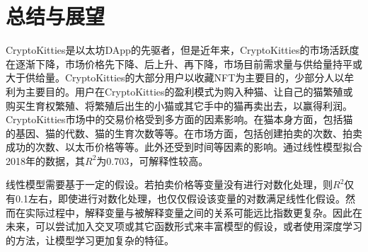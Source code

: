 \documentclass{myreport}
\begin{document}
\section{总结与展望}
CryptoKitties是以太坊DApp的先驱者，但是近年来，CryptoKitties的市场活跃度在逐渐下降，市场价格先下降、后上升、再下降，市场目前需求量与供给量持平或大于供给量。CryptoKitties的大部分用户以收藏NFT为主要目的，少部分人以牟利为主要目的。用户在CryptoKitties的盈利模式为购入种猫、让自己的猫繁殖或购买生育权繁殖、将繁殖后出生的小猫或其它手中的猫再卖出去，以赢得利润。CryptoKitties市场中的交易价格受到多方面的因素影响。在猫本身方面，包括猫的基因、猫的代数、猫的生育次数等等。在市场方面，包括创建拍卖的次数、拍卖成功的次数、以太币价格等等。此外还受到时间等因素的影响。通过线性模型拟合2018年的数据，其$R^2$为0.703，可解释性较高。

线性模型需要基于一定的假设。若拍卖价格等变量没有进行对数化处理，则$R^2$仅有0.1左右，即使进行对数化处理，也仅仅假设该变量的对数满足线性化假设。然而在实际过程中，解释变量与被解释变量之间的关系可能远比指数更复杂。因此在未来，可以尝试加入交叉项或其它函数形式来丰富模型的假设，或者使用深度学习的方法，让模型学习更加复杂的特征。


\nocite{*}
\printbibliography[heading=bibintoc, title=参考文献]
\appendix
% 
\end{document}
